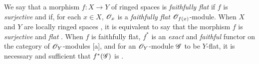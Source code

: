 \begin{env}[6.7.8]
\label{0.6.7.8}
We say that a morphism $f:X\to Y$ of ringed spaces is \emph{faithfully flat} if $f$ is
\emph{surjective} and if, for each $x\in X$, $\mathscr{O}_x$ is a \emph{faithfully flat}
$\mathscr{O}_{f(x)}$-module. When $X$ and $Y$ are locally ringed spaces , it is
equivalent to say that the morphism $f$ is \emph{surjective} and \emph{flat}
. When $f$ is faithfully flat, $f^*$ is an \emph{exact} and \emph{faithful}
functor on the category of $\mathscr{O}_Y$-modules [a], and for an $\mathscr{O}_Y$-module
$\mathscr{G}$ to be $Y$-flat, it is necessary and sufficient that $f^*(\mathscr{G})$ is
.
\end{env}
